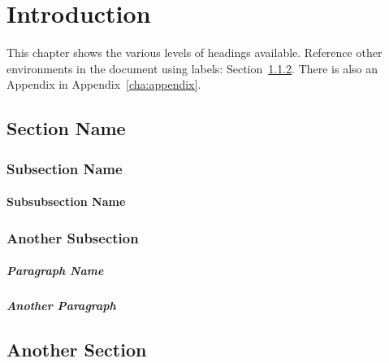 \chapter{Introduction} %
\label{cha:chapter_name}

This chapter shows the various levels of headings available. Reference other environments in the document using labels: Section~\ref{sub:another_subsection}. There is also an Appendix in Appendix~\ref{cha:appendix}.

\section{Section Name} %
\label{sec:section_name}

\blindtext

\subsection{Subsection Name} %
\label{sub:subsection_name}

\blindtext

\subsubsection{Subsubsection Name} %
\label{ssub:subsubsection_name}

\blindtext

\subsection{Another Subsection} %
\label{sub:another_subsection}

\paragraph{Paragraph Name} %
\label{par:paragraph_name}

\blindtext

\paragraph{Another Paragraph} %
\label{par:another_paragraph}

\blindtext

\section{Another Section} %
\label{sec:another_section}

\blindtext
